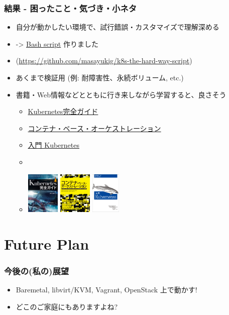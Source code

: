 \documentclass[aspectratio=169,11pt,hyperref={colorlinks=true}]{beamer}
\begin{document}
\begin{frame}
  \frametitle{結果 - 困ったこと・気づき・小ネタ}
  \begin{itemize}
    \item 自分が動かしたい環境で、試行錯誤・カスタマイズで理解深める
    \item[] -> \href{https://github.com/masayukig/k8s-the-hard-way-script}{Bash script} 作りました
    \item[] (\url{https://github.com/masayukig/k8s-the-hard-way-script})
    \item あくまで検証用 (例: 耐障害性、永続ボリューム, etc.)
    \item 書籍・Web情報などとともに行き来しながら学習すると、良さそう
    \begin{itemize}
      \item
      \href{https://book.impress.co.jp/books/1118101055}{Kubernetes完全ガイド}
      \item
      \href{https://www.shoeisha.co.jp/book/detail/9784798155371}{コンテナ・ベース・オーケストレーション}
      \item
      \href{https://www.oreilly.co.jp/books/9784873118406/}{入門 Kubernetes}
      \item[]
      \item[] \includegraphics[height=20mm]{images/kubernetes_complete_guide.jpg}
       \includegraphics[height=20mm]{images/container_based_orchestration.jpg}
       \includegraphics[height=20mm]{images/kubernetes_up_and_running.jpeg}
    \end{itemize}
  \end{itemize}
\end{frame}

\section{Future Plan}
\begin{frame}
  \frametitle{今後の(私の)展望}
  \begin{itemize}
    \item Baremetal, libvirt/KVM, Vagrant, OpenStack 上で動かす!
    \item[] どこのご家庭にもありますよね?
  \end{itemize}
\end{frame}
\end{document}
